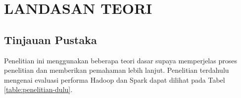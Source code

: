 \chapter{LANDASAN TEORI}

\section{Tinjauan Pustaka}
Penelitian ini menggunakan beberapa teori dasar supaya memperjelas proses penelitian dan memberikan pemahaman lebih lanjut. Penelitian terdahulu mengenai evaluasi performa Hadoop dan Spark dapat dilihat pada Tabel \ref{table:penelitian-dulu}.


